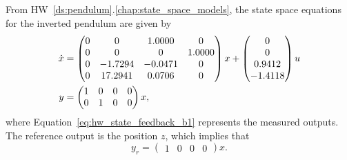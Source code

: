 
From HW~\ref{ds:pendulum}.\ref{chap:state_space_models}, the state space equations for the inverted pendulum are given by
\begin{align}
\dot{x} &= \begin{pmatrix}
       0 &        0 &   1.0000 &        0 \\
       0 &        0 &        0 &   1.0000 \\
       0 &  -1.7294 &   -0.0471 &        0 \\
       0 &  17.2941 &   0.0706 &        0 \\
\end{pmatrix} x + \begin{pmatrix}
     0 \\
     0 \\
0.9412 \\
-1.4118 \\
\end{pmatrix} u \notag \\
y &= \begin{pmatrix}
1 & 0 & 0 & 0 \\
0 & 1 & 0 & 0 
\end{pmatrix} x, \label{eq:hw_state_feedback_b1}
\end{align}
where Equation~\eqref{eq:hw_state_feedback_b1} represents the measured outputs.  The reference output is the position $z$, which implies that
\[
y_r = \begin{pmatrix} 1 & 0 & 0 & 0 \end{pmatrix} x.
\]
